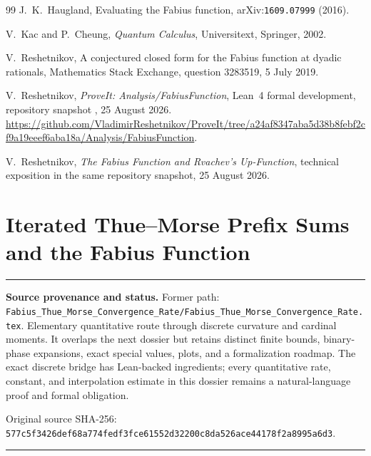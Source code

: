 \documentclass[11pt,oneside]{article}
\theoremstyle{definition}
\theoremstyle{remark}
\newenvironment{boxedremark}{%
  \par\smallskip\noindent\begin{center}\begin{minipage}{0.94\textwidth}%
  \color{black}\hrule\vspace{0.6em}\small
}{%
  \vspace{0.6em}\hrule\end{minipage}\end{center}\smallskip
}
\begin{document}
\begin{thebibliography}{99}
J.~K.~Haugland,
\newblock Evaluating the Fabius function,
\newblock arXiv:\nolinkurl{1609.07999} (2016).

V.~Kac and P.~Cheung,
\newblock \emph{Quantum Calculus},
\newblock Universitext, Springer, 2002.

V.~Reshetnikov,
\newblock A conjectured closed form for the Fabius function at dyadic rationals,
\newblock Mathematics Stack Exchange, question 3283519, 5 July 2019.

V.~Reshetnikov,
\newblock \emph{ProveIt: Analysis/FabiusFunction},
\newblock Lean~4 formal development, repository snapshot
  , 25 August 2026.
\newblock
\url{https://github.com/VladimirReshetnikov/ProveIt/tree/a24af8347aba5d38b8febf2cf9a19eeef6aba18a/Analysis/FabiusFunction}.

V.~Reshetnikov,
\newblock \emph{The Fabius Function and Rvachev's Up-Function},
\newblock technical exposition in the same repository snapshot, 25 August 2026.

\end{thebibliography}


\renewcommand{\arraystretch}{1}




\clearpage
\part{Iterated Thue--Morse Prefix Sums and the Fabius Function}
\label{part:tmrate}
\begin{boxedremark}
\textbf{Source provenance and status.} Former path: \nolinkurl{Fabius_Thue_Morse_Convergence_Rate/Fabius_Thue_Morse_Convergence_Rate.tex}.  Elementary quantitative route through discrete curvature and cardinal moments.  It overlaps the next dossier but retains distinct finite bounds, binary-phase expansions, exact special values, plots, and a formalization roadmap.  The exact discrete bridge has Lean-backed ingredients; every quantitative rate, constant, and interpolation estimate in this dossier remains a natural-language proof and formal obligation.\par\smallskip Original source SHA-256: \nolinkurl{577c5f3426def68a774fedf3fce61552d32200c8da526ace44178f2a8995a6d3}.
\end{boxedremark}
\end{document}
